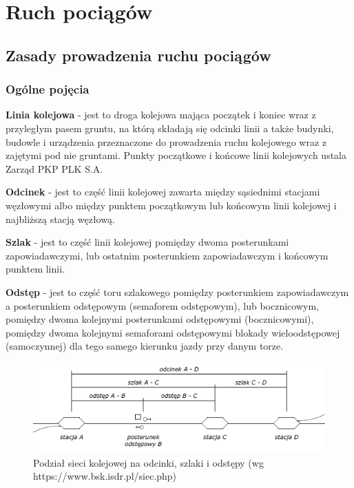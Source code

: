 \part{Ruch pociągów}
\chapter{Zasady prowadzenia ruchu pociągów}
\section{Ogólne pojęcia}

\textbf{Linia kolejowa} - jest to droga kolejowa mająca początek i koniec wraz z przyległym pasem gruntu, na którą składają się odcinki linii a także budynki, budowle i urządzenia przeznaczone do prowadzenia ruchu kolejowego wraz z zajętymi pod nie gruntami. Punkty początkowe i końcowe linii kolejowych ustala Zarząd PKP PLK S.A.

\textbf{Odcinek} - jest to część linii kolejowej zawarta między sąsiednimi stacjami węzłowymi albo między punktem początkowym lub końcowym linii kolejowej i najbliższą stacją węzłową.

\textbf{Szlak} - jest to część linii kolejowej pomiędzy dwoma posterunkami zapowiadawczymi, lub ostatnim posterunkiem zapowiadawczym i końcowym punktem linii. 

\textbf{Odstęp} - jest to część toru szlakowego pomiędzy posterunkiem zapowiadawczym a posterunkiem odstępowym (semaforem odstępowym), lub bocznicowym, pomiędzy dwoma kolejnymi posterunkami odstępowymi (bocznicowymi), pomiędzy dwoma kolejnymi semaforami odstępowymi blokady wieloodstępowej (samoczynnej) dla tego samego kierunku jazdy przy danym torze.

	\begin{figure}
		\includegraphics[width=13cm]{skryptkierownik-img/skryptkierownik-img001.png}
		\caption{Podział sieci kolejowej na odcinki, szlaki i odstępy (wg https://www.bsk.isdr.pl/siec.php)}
		\label{fig:siec}
	\end{figure}


